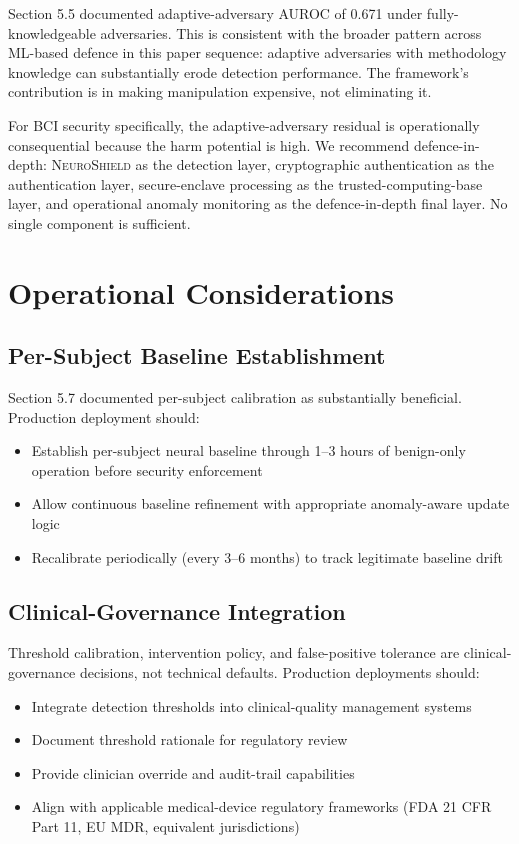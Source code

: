 \documentclass[sigconf,nonacm]{acmart}
\begin{document}
Section 5.5 documented adaptive-adversary AUROC of 0.671 under
fully-knowledgeable adversaries. This is consistent with the
broader pattern across ML-based defence in this paper sequence:
adaptive adversaries with methodology knowledge can substantially
erode detection performance. The framework's contribution is in
making manipulation expensive, not eliminating it.

For BCI security specifically, the adaptive-adversary residual is
operationally consequential because the harm potential is high.
We recommend defence-in-depth: \textsc{NeuroShield} as the
detection layer, cryptographic authentication as the authentication
layer, secure-enclave processing as the trusted-computing-base
layer, and operational anomaly monitoring as the defence-in-depth
final layer. No single component is sufficient.

\section{Operational Considerations}

\subsection{Per-Subject Baseline Establishment}

Section 5.7 documented per-subject calibration as substantially
beneficial. Production deployment should:

\begin{itemize}
  \item Establish per-subject neural baseline through 1--3 hours of
        benign-only operation before security enforcement
  \item Allow continuous baseline refinement with appropriate
        anomaly-aware update logic
  \item Recalibrate periodically (every 3--6 months) to track
        legitimate baseline drift
\end{itemize}

\subsection{Clinical-Governance Integration}

Threshold calibration, intervention policy, and false-positive
tolerance are clinical-governance decisions, not technical
defaults. Production deployments should:

\begin{itemize}
  \item Integrate detection thresholds into clinical-quality
        management systems
  \item Document threshold rationale for regulatory review
  \item Provide clinician override and audit-trail capabilities
  \item Align with applicable medical-device regulatory
        frameworks (FDA 21 CFR Part 11, EU MDR, equivalent
        jurisdictions)
\end{itemize}
\end{document}
